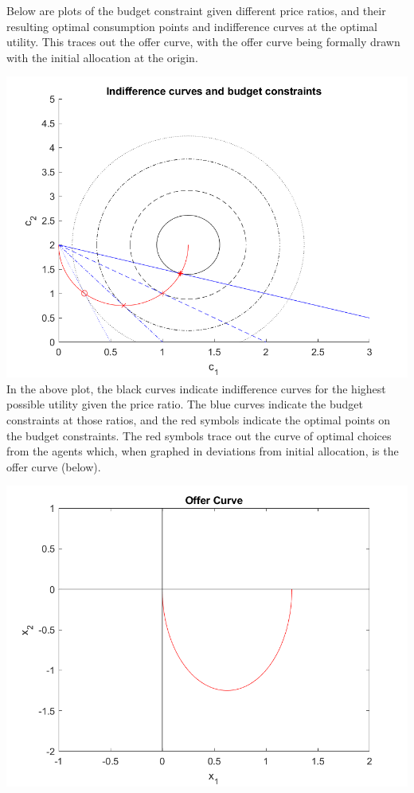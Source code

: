 \documentclass[11pt]{article} %
\begin{document}
Below are plots of the budget constraint given different price ratios, and their resulting optimal consumption points and indifference curves at the optimal utility. This traces out the offer curve, with the offer curve being formally drawn with the initial allocation at the origin.

\includegraphics{indiff1}
In the above plot, the black curves indicate indifference curves for the highest possible utility given the price ratio. The blue curves indicate the budget constraints at those ratios, and the red symbols indicate the optimal points on the budget constraints. The red symbols trace out the curve of optimal choices from the agents which, when graphed in deviations from initial allocation, is the offer curve (below).

\includegraphics{off1}
\end{document}
